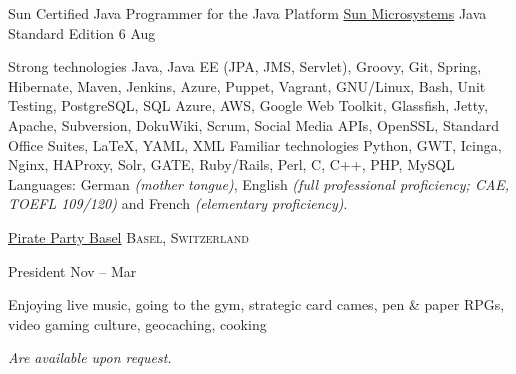 \documentclass[10pt,a4paper]{article}
\begin{document}
\headedsection
  {Sun Certified Java Programmer for the Java Platform}
  {\href{http://education.oracle.com/}{Sun Microsystems}} {%
  \headedsubsection
    {Java Standard Edition 6}
    {Aug }
    {}
}

\spacedhrule{0.8em}{-0.4em}


\inlineheadsection  %
  {Strong technologies}
  {Java, Java EE (JPA, JMS, Servlet), Groovy, Git, Spring, Hibernate, Maven, Jenkins, Azure, Puppet, Vagrant, GNU/Linux, Bash, Unit Testing, PostgreSQL, SQL Azure, AWS, Google Web Toolkit, Glassfish, Jetty, Apache, Subversion, DokuWiki, Scrum, Social Media APIs, OpenSSL, Standard Office Suites, LaTeX, YAML, XML}
\vspace{0.5em}
\inlineheadsection
  {Familiar technologies}
  {Python, GWT, Icinga, Nginx, HAProxy, Solr, GATE, Ruby/Rails, Perl, C, C++, PHP, MySQL }
\vspace{0.5em}
\inlineheadsection
  {Languages:}
  {German \emph{(mother tongue)}, English \emph{(full professional proficiency; CAE, TOEFL 109/120)} and French \emph{(elementary proficiency)}.}

\spacedhrule{1.9em}{-0.4em}


\headedsection  %
  {\href{http://www.piraten-basel.ch/}{Pirate Party Basel}}
  {\textsc{Basel, Switzerland}} {%

  \headedsubsection  %
    {President}
    {Nov  -- Mar }
    {}
}

\spacedhrule{1.1em}{-0.4em}


Enjoying live music, going to the gym, strategic card cames, pen \& paper RPGs, video gaming culture, geocaching, cooking

\spacedhrule{1.8em}{-0.4em}

\emph{Are available upon request.}
\end{document}
